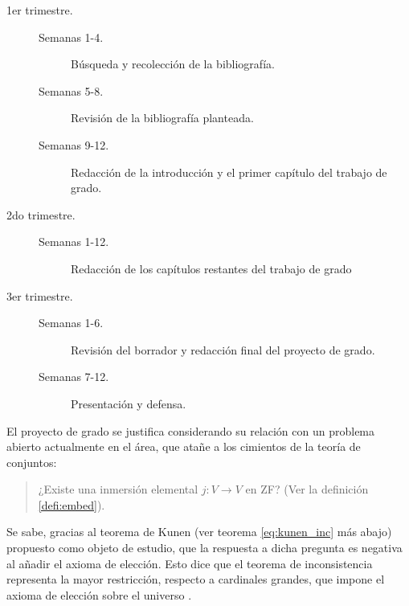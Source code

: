 \documentclass[12pt]{article}
\begin{document}
    \begin{description}
        \let\olditem\item
        \renewcommand\item[1][]{\olditem[\normalfont #1.]}
        \item[1er trimestre]\hphantom{a}
                \begin{description}
                    \item[Semanas 1-4] Búsqueda y recolección de la bibliografía.
                    \item[Semanas 5-8] Revisión de la bibliografía planteada.
                    \item[Semanas 9-12] Redacción de la introducción y el primer capítulo
                                        del trabajo de grado.
                \end{description}
        \item[2do trimestre]\hphantom{a}
                \begin{description}
                    \item[Semanas 1-12] Redacción de los capítulos restantes del trabajo de grado
                \end{description}
        \item[3er trimestre]\hphantom{a}
                \begin{description}
                    \item[Semanas 1-6] Revisión del borrador y redacción final del
                                       proyecto de grado.
                    \item[Semanas 7-12] Presentación y defensa.
                \end{description}
    \end{description}

    El proyecto de grado se justifica considerando
    su relación con un problema abierto actualmente en el área,
    que atañe a los cimientos de la teoría de conjuntos:
    \begin{quote}
        ¿Existe una inmersión elemental $j\colon V\to V$ en ZF? (Ver la definición \ref{defi:embed}).
    \end{quote}
    Se sabe, gracias al teorema de Kunen (ver teorema \ref{eq:kunen_inc} más abajo) propuesto como objeto de estudio,
    que la respuesta a dicha pregunta es negativa al añadir el axioma de elección. Esto dice
    que el teorema de inconsistencia representa la mayor restricción, respecto a cardinales grandes,
    que impone el axioma de elección sobre el universo \cite[Pág 324]{kanamori_higher_2009}.
\end{document}
